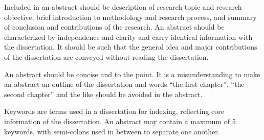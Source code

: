 \begin{abstract*}
  Included in an abstract should be description of research topic and research objective, brief introduction to methodology and research process, and summary of conclusion and contributions of the research.
  An abstract should be characterized by independence and clarity and carry identical information with the dissertation.
  It should be such that the general idea and major contributions of the dissertation are conveyed without reading the dissertation.

  An abstract should be concise and to the point.
  It is a misunderstanding to make an abstract an outline of the dissertation and words “the first chapter”, “the second chapter” and the like should be avoided in the abstract.

  Keywords are terms used in a dissertation for indexing, reflecting core information of the dissertation.
  An abstract may contain a maximum of 5 keywords, with semi-colons used in between to separate one another.

\end{abstract*}
